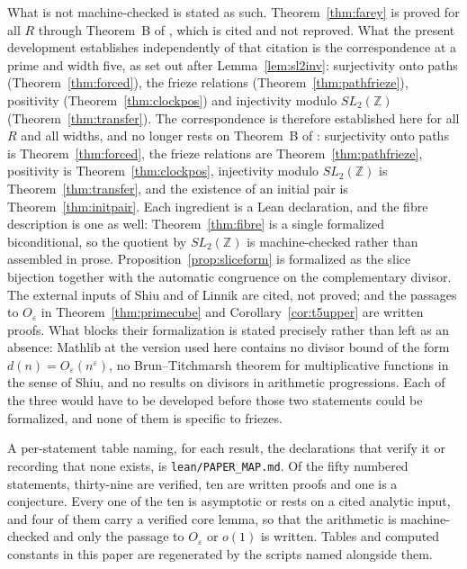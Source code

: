 \documentclass[11pt]{article}
\theoremstyle{plain}
\theoremstyle{definition}
\newcommand{\Z}{\mathbb{Z}}
\begin{document}
What is not machine-checked is stated as such. Theorem~\ref{thm:farey} is proved for all $R$
through Theorem~B of \cite{KSSZ}, which is cited and not reproved. What the present
development establishes independently of that citation is the correspondence at a prime and
width five, as set out after Lemma~\ref{lem:sl2inv}: surjectivity onto paths
(Theorem~\ref{thm:forced}), the frieze relations (Theorem~\ref{thm:pathfrieze}), positivity
(Theorem~\ref{thm:clockpos}) and injectivity modulo $SL_2(\Z)$
(Theorem~\ref{thm:transfer}). The correspondence is therefore established here for all $R$ and all widths, and no longer
rests on Theorem~B of \cite{KSSZ}: surjectivity onto paths is Theorem~\ref{thm:forced},
the frieze relations are Theorem~\ref{thm:pathfrieze}, positivity is
Theorem~\ref{thm:clockpos}, injectivity modulo $SL_2(\Z)$ is Theorem~\ref{thm:transfer},
and the existence of an initial pair is Theorem~\ref{thm:initpair}. Each ingredient is a
Lean declaration, and the fibre description is one as well: Theorem~\ref{thm:fibre} is a
single formalized biconditional, so the quotient by $SL_2(\Z)$ is machine-checked rather
than assembled in prose.
Proposition~\ref{prop:sliceform} is formalized as the slice bijection together with the
automatic congruence on the complementary divisor. The external inputs of Shiu and of Linnik are
cited, not proved; and the passages to $O_\varepsilon$ in
Theorem~\ref{thm:primecube} and Corollary~\ref{cor:t5upper} are written proofs. What blocks
their formalization is stated precisely rather than left as an absence: Mathlib at the
version used here contains no divisor bound of the form $d(n)=O_\varepsilon(n^\varepsilon)$,
no Brun--Titchmarsh theorem for multiplicative functions in the sense of Shiu, and no
results on divisors in arithmetic progressions. Each of the three would have to be developed
before those two statements could be formalized, and none of them is specific to friezes.

A per-statement table naming, for each result, the declarations that verify it or recording
that none exists, is \texttt{lean/PAPER\_MAP.md}. Of the fifty numbered statements, thirty-nine
are verified, ten are written proofs and one is a conjecture. Every one of the ten is
asymptotic or rests on a cited analytic input, and four of them carry a verified core lemma,
so that the arithmetic is machine-checked and only the passage to $O_\varepsilon$ or $o(1)$
is written. Tables and computed constants in this paper are
regenerated by the scripts named alongside them.
\end{document}
